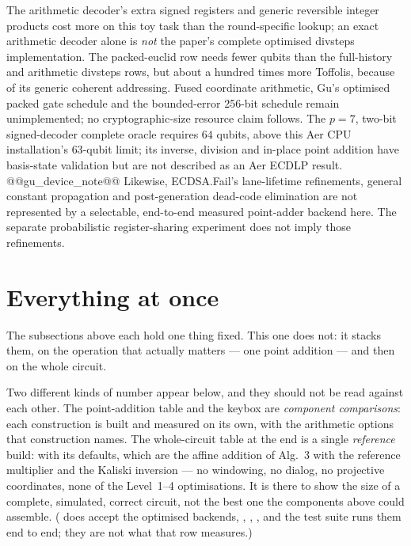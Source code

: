 The arithmetic decoder's extra signed registers and generic reversible
integer products cost more on this toy task than the round-specific lookup;
an exact arithmetic decoder alone is \emph{not} the paper's complete optimised
divsteps implementation. The packed-euclid row needs fewer qubits than the
full-history and arithmetic divsteps rows, but about a hundred times more
Toffolis, because of its generic coherent addressing. Fused coordinate arithmetic, Gu's
optimised packed gate schedule and the bounded-error 256-bit schedule remain
unimplemented; no cryptographic-size resource claim follows. The $p=7$,
two-bit signed-decoder complete oracle requires $64$ qubits, above this Aer
CPU installation's $63$-qubit limit; its inverse, division and in-place point
addition have basis-state validation but are not described as an Aer ECDLP
result.
@@gu_device_note@@
Likewise, ECDSA.Fail's lane-lifetime refinements, general constant
propagation and post-generation dead-code elimination are not represented
by a selectable, end-to-end measured point-adder backend here. The separate
probabilistic register-sharing experiment does not imply those refinements.

\section{Everything at once}\label{ec:sec:cost}

The subsections above each hold one thing fixed. This one does not: it stacks them, on the operation
that actually matters --- one point addition --- and then on the whole circuit.

Two different kinds of number appear below, and they should not be read against each other. The
point-addition table and the keybox are \emph{component comparisons}: each construction is built
and measured on its own, with the arithmetic options that construction names. The whole-circuit
table at the end is a single \emph{reference} build: 
with its defaults, which are the affine addition of Alg.~3 with the reference multiplier and the
\cite{ec:hjnrs20} Kaliski inversion --- no windowing, no dialog, no projective coordinates, none of
the Level~1--4 optimisations. It is there to show the size of a complete, simulated, correct
circuit, not the best one the components above could assemble. ( does accept the
optimised backends, , , , and the
test suite runs them end to end; they are not what that row measures.)

